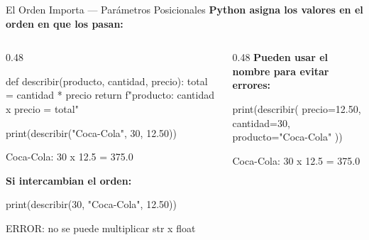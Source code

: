 \documentclass[aspectratio=169, 11pt]{beamer}
\begin{document}
\begin{frame}[fragile,shrink=28]{El Orden Importa --- Parámetros Posicionales}
  \vspace{-6pt}
  {\footnotesize\color{arcaDark}\bfseries
    Python asigna los valores en el orden en que los pasan:}

  \vspace{4pt}
  \begin{columns}[T]
    \begin{column}{0.48\textwidth}
      \begin{pyblock}
def describir(producto, cantidad, precio):
    total = cantidad * precio
    return f"{producto}: {cantidad} x {precio} = {total}"

print(describir("Coca-Cola", 30, 12.50))
      \end{pyblock}
      \vspace{-2pt}
      \begin{outputblock}
Coca-Cola: 30 x 12.5 = 375.0
      \end{outputblock}

      \vspace{2pt}
      {\scriptsize\color{codeOrange}\bfseries\faExclamationTriangle\hspace{2pt}
        Si intercambian el orden:}
      \begin{pyblock}
print(describir(30, "Coca-Cola", 12.50))
      \end{pyblock}
      \vspace{-2pt}
      \begin{outputblock}
ERROR: no se puede multiplicar str x float
      \end{outputblock}
    \end{column}

    \begin{column}{0.48\textwidth}
      {\scriptsize\color{codeGreen}\bfseries\faCheckCircle\hspace{2pt}
        Pueden usar el nombre para evitar errores:}
      \begin{pyblock}
print(describir(
    precio=12.50,
    cantidad=30,
    producto="Coca-Cola"
))
      \end{pyblock}
      \vspace{-2pt}
      \begin{outputblock}
Coca-Cola: 30 x 12.5 = 375.0
      \end{outputblock}


\end{column}
\end{columns}
\end{frame}
\end{document}
